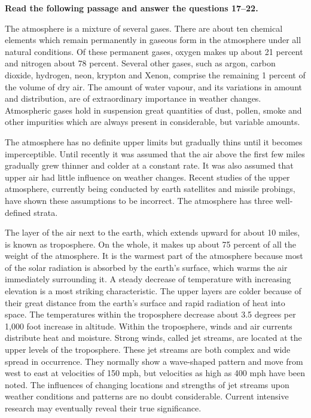 \begin{context}
\textbf{Read the following passage and answer the questions 17--22.}\par\smallskip
The atmosphere is a mixture of several gases. There are about ten chemical elements which remain permanently in gaseous form in the atmosphere under all natural conditions. Of these permanent gases, oxygen makes up about 21 percent and nitrogen about 78 percent. Several other gases, such as argon, carbon dioxide, hydrogen, neon, krypton and Xenon, comprise the remaining 1 percent of the volume of dry air. The amount of water vapour, and its variations in amount and distribution, are of extraordinary importance in weather changes. Atmospheric gases hold in suspension great quantities of dust, pollen, smoke and other impurities which are always present in considerable, but variable amounts.

The atmosphere has no definite upper limits but gradually thins until it becomes imperceptible. Until recently it was assumed that the air above the first few miles gradually grew thinner and colder at a constant rate. It was also assumed that upper air had little influence on weather changes. Recent studies of the upper atmosphere, currently being conducted by earth satellites and missile probings, have shown these assumptions to be incorrect. The atmosphere has three well-defined strata.

The layer of the air next to the earth, which extends upward for about 10 miles, is known as troposphere. On the whole, it makes up about 75 percent of all the weight of the atmosphere. It is the warmest part of the atmosphere because most of the solar radiation is absorbed by the earth's surface, which warms the air immediately surrounding it. A steady decrease of temperature with increasing elevation is a most striking characteristic. The upper layers are colder because of their great distance from the earth's surface and rapid radiation of heat into space. The temperatures within the troposphere decrease about 3.5 degrees per 1,000 foot increase in altitude. Within the troposphere, winds and air currents distribute heat and moisture. Strong winds, called jet streams, are located at the upper levels of the troposphere. These jet streams are both complex and wide spread in occurrence. They normally show a wave-shaped pattern and move from west to east at velocities of 150 mph, but velocities as high as 400 mph have been noted. The influences of changing locations and strengths of jet streams upon weather conditions and patterns are no doubt considerable. Current intensive research may eventually reveal their true significance.


\end{context}
